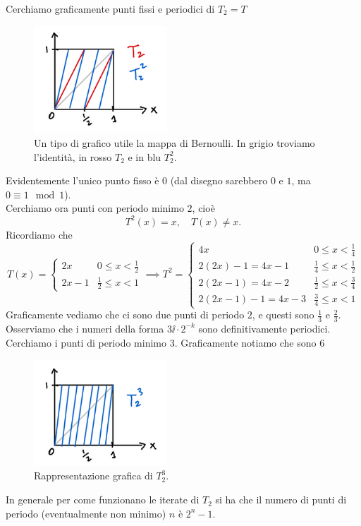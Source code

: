 \begin{example}
Cerchiamo graficamente punti fissi e periodici di $T_2=T$
\begin{figure}[!htb]
    \centering
    \includegraphics[width=5cm]{Immagini/Bernoulli.png}
    \caption{Un tipo di grafico utile la mappa di Bernoulli. In grigio troviamo l'identit\`a, in rosso $T_2$ e in blu $T_2^2$.}
\end{figure}

\noindent Evidentemente l'unico punto fisso \`e $0$ (dal disegno sarebbero $0$ e $1$, ma $0\equiv 1\mod 1$).\\
Cerchiamo ora punti con periodo minimo $2$, cio\`e
\[T^2(x)=x,\quad T(x)\neq x.\]
Ricordiamo che
\[T(x)=\begin{cases}
2x & 0\leq x< \frac12\\
2x-1 & \frac12\leq x<1
\end{cases}\implies
T^2=\begin{cases}
4x & 0\leq x<\frac14\\
2(2x)-1=4x-1 & \frac14\leq x<\frac12\\
2(2x-1)=4x-2 & \frac12\leq x<\frac34\\
2(2x-1)-1=4x-3 & \frac34\leq x<1
\end{cases}\]
Graficamente vediamo che ci sono due punti di periodo $2$, e questi sono $\frac13$ e $\frac23$. Osserviamo che i numeri della forma $3\ii\cdot 2^{-k}$ sono definitivamente periodici.\\
Cerchiamo i punti di periodo minimo $3$. Graficamente notiamo che sono $6$
    
\begin{figure}[!htb]
    \centering
    \includegraphics[width=5cm]{Immagini/Bernoulli_iterata.png}
    \caption{Rappresentazione grafica di $T^3_2$.}
\end{figure}

\noindent
In generale per come funzionano le iterate di $T_2$ si ha che il numero di punti di periodo (eventualmente non minimo) $n$ \`e $2^n-1$.
\end{example}

